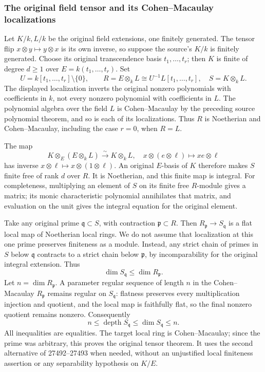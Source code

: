 \subsubsection{The original field tensor and its Cohen--Macaulay localizations}\label{the-original-field-tensor-and-its-cohenmacaulay-localizations}

Let \(K/k,L/k\) be the original field extensions, one finitely generated. The tensor flip \(x\otimes y\mapsto y\otimes x\) is its own inverse, so suppose the source's \(K/k\) is finitely generated. Choose its original transcendence basis \(t_1,\ldots,t_r\); then \(K\) is finite of degree \(d\ge1\) over \(E=k(t_1,\ldots,t_r)\). Set \[
 U=k[t_1,\ldots,t_r]\setminus\{0\},\qquad
 R=E\otimes_kL\cong U^{-1}L[t_1,\ldots,t_r],
 \quad S=K\otimes_kL.
\] The displayed localization inverts the original nonzero polynomials with coefficients in \(k\), not every nonzero polynomial with coefficients in \(L\). The polynomial algebra over the field \(L\) is Cohen--Macaulay by the preceding source polynomial theorem, and so is each of its localizations. Thus \(R\) is Noetherian and Cohen--Macaulay, including the case \(r=0\), when \(R=L\).

The map \[
 K\otimes_E(E\otimes_kL)\xrightarrow{\sim}K\otimes_kL,
 \quad x\otimes(e\otimes\ell)\longmapsto xe\otimes\ell
\] has inverse \(x\otimes\ell\mapsto x\otimes(1\otimes\ell)\). An original \(E\)-basis of \(K\) therefore makes \(S\) finite free of rank \(d\) over \(R\). It is Noetherian, and this finite map is integral. For completeness, multiplying an element of \(S\) on its finite free \(R\)-module gives a matrix; its monic characteristic polynomial annihilates that matrix, and evaluation on the unit gives the integral equation for the original element.

Take any original prime \(\mathfrak q\subset S\), with contraction \(\mathfrak p\subset R\). Then \(R_{\mathfrak p}\to S_{\mathfrak q}\) is a flat local map of Noetherian local rings. We do not assume that localization at this one prime preserves finiteness as a module. Instead, any strict chain of primes in \(S\) below \(\mathfrak q\) contracts to a strict chain below \(\mathfrak p\), by incomparability for the original integral extension. Thus \[
 \dim S_{\mathfrak q}\le\dim R_{\mathfrak p}.
\] Let \(n=\dim R_{\mathfrak p}\). A parameter regular sequence of length \(n\) in the Cohen--Macaulay \(R_{\mathfrak p}\) remains regular on \(S_{\mathfrak q}\): flatness preserves every multiplication injection and quotient, and the local map is faithfully flat, so the final nonzero quotient remains nonzero. Consequently \[
 n\le\operatorname{depth}S_{\mathfrak q}
   \le\dim S_{\mathfrak q}\le n.
\] All inequalities are equalities. The target local ring is Cohen--Macaulay; since the prime was arbitrary, this proves the original tensor theorem. It uses the second alternative of 27492--27493 when needed, without an unjustified local finiteness assertion or any separability hypothesis on \(K/E\).

